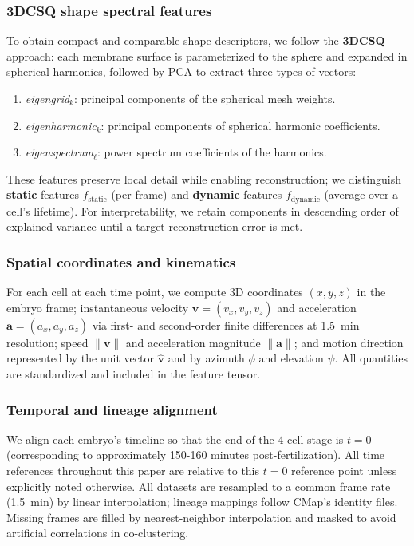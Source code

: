 \documentclass[unnumsec,webpdf,modern,large,namedate]{oup-authoring-template}%
\theoremstyle{thmstyleone}\newtheorem{theorem}{Theorem}
\theoremstyle{thmstyletwo}\newtheorem{example}{Example}
\theoremstyle{thmstylethree}\newtheorem{definition}{Definition}
\begin{document}
\subsubsection{3DCSQ shape spectral features}
To obtain compact and comparable shape descriptors, we follow the \textbf{3DCSQ} approach: each membrane surface is parameterized to the sphere and expanded in spherical harmonics, followed by PCA to extract three types of vectors:
\begin{enumerate}
    \item \textit{eigengrid}$_k$: principal components of the spherical mesh weights.
    \item \textit{eigenharmonic}$_k$: principal components of spherical harmonic coefficients.
    \item \textit{eigenspectrum}$_\ell$: power spectrum coefficients of the harmonics.
\end{enumerate}
These features preserve local detail while enabling reconstruction; we distinguish \textbf{static} features $f_{\text{static}}$ (per-frame) and \textbf{dynamic} features $f_{\text{dynamic}}$ (average over a cell's lifetime).  
For interpretability, we retain components in descending order of explained variance until a target reconstruction error is met.

\subsubsection{Spatial coordinates and kinematics}
For each cell at each time point, we compute 3D coordinates $(x,y,z)$ in the embryo frame; instantaneous velocity $\mathbf v=(v_x,v_y,v_z)$ and acceleration $\mathbf a=(a_x,a_y,a_z)$ via first- and second-order finite differences at 1.5~min resolution; speed $\|\mathbf v\|$ and acceleration magnitude $\|\mathbf a\|$; and motion direction represented by the unit vector $\hat{\mathbf v}$ and by azimuth $\phi$ and elevation $\psi$. All quantities are standardized and included in the feature tensor.

\subsubsection{Temporal and lineage alignment}
We align each embryo's timeline so that the end of the 4-cell stage is $t=0$ (corresponding to approximately 150-160 minutes post-fertilization). All time references throughout this paper are relative to this $t=0$ reference point unless explicitly noted otherwise. All datasets are resampled to a common frame rate (1.5~min) by linear interpolation; lineage mappings follow CMap's identity files. Missing frames are filled by nearest-neighbor interpolation and masked to avoid artificial correlations in co-clustering.
\end{document}

